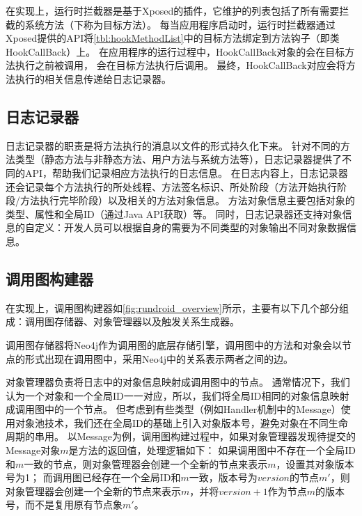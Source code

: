 在实现上，运行时拦截器是基于Xposed的插件，它维护的列表包括了所有需要拦截的系统方法（下称为目标方法）。%
每当应用程序启动时，运行时拦截器通过Xposed提供的API将\autoref{tbl:hookMethodList}中的目标方法绑定到方法钩子（即类HookCallBack）上。
在应用程序的运行过程中，HookCallBack对象的会在目标方法执行之前被调用，
会在目标方法执行后调用。
最终，HookCallBack对应会将方法执行的相关信息传递给日志记录器。


\subsection{日志记录器}

日志记录器的职责是将方法执行的消息以文件的形式持久化下来。
针对不同的方法类型（静态方法与非静态方法、用户方法与系统方法等），日志记录器提供了不同的API，帮助我们记录相应方法执行的日志信息。
在日志内容上，日志记录器还会记录每个方法执行的所处线程、方法签名标识、所处阶段（方法开始执行阶段/方法执行完毕阶段）以及相关的方法对象信息。
方法对象信息主要包括对象的类型、属性和全局ID（通过Java API获取）等。
同时，日志记录器还支持对象信息的自定义：开发人员可以根据自身的需要为不同类型的对象输出不同对象数据信息。




\subsection{调用图构建器}

在实现上，调用图构建器如\autoref{fig:rundroid_overview}所示，主要有以下几个部分组成：调用图存储器、对象管理器以及触发关系生成器。

调用图存储器将Neo4j作为调用图的底层存储引擎，调用图中的方法和对象会以节点的形式出现在调用图中，采用Neo4j中的关系表示两者之间的边。

对象管理器负责将日志中的对象信息映射成调用图中的节点。
通常情况下，我们认为一个对象和一个全局ID一一对应，所以，我们将全局ID相同的对象信息映射成调用图中的一个节点。
但考虑到有些类型（例如Handler机制中的Message）使用对象池技术，我们还在全局ID的基础上引入对象版本号，避免对象在不同生命周期的串用。
以Message为例，调用图构建过程中，如果对象管理器发现待提交的Message对象$m$是方法的返回值，处理逻辑如下：
如果调用图中不存在一个全局ID和$m$一致的节点，则对象管理器会创建一个全新的节点来表示$m$，设置其对象版本号为1；
而调用图已经存在一个全局ID和$m$一致，版本号为$version$的节点$m'$，则对象管理器会创建一个全新的节点来表示$m$，并将$version + 1$作为节点$m$的版本号，而不是复用原有节点象$m'$。

